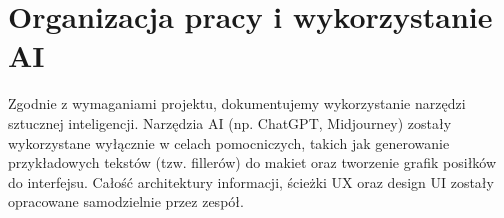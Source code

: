\chapter{Organizacja pracy i wykorzystanie AI}
Zgodnie z wymaganiami projektu, dokumentujemy wykorzystanie narzędzi sztucznej inteligencji. Narzędzia AI (np. ChatGPT, Midjourney) zostały wykorzystane wyłącznie w celach pomocniczych, takich jak generowanie przykładowych tekstów (tzw. fillerów) do makiet oraz tworzenie grafik posiłków do interfejsu. Całość architektury informacji, ścieżki UX oraz design UI zostały opracowane samodzielnie przez zespół.